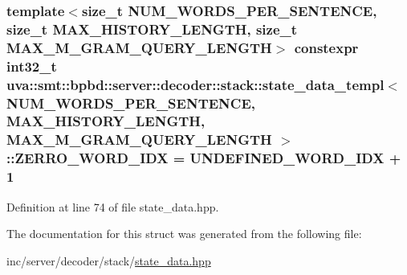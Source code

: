 \subsubsection[{Z\+E\+R\+R\+O\+\_\+\+W\+O\+R\+D\+\_\+\+I\+D\+X}]{\setlength{\rightskip}{0pt plus 5cm}template$<$size\+\_\+t N\+U\+M\+\_\+\+W\+O\+R\+D\+S\+\_\+\+P\+E\+R\+\_\+\+S\+E\+N\+T\+E\+N\+C\+E, size\+\_\+t M\+A\+X\+\_\+\+H\+I\+S\+T\+O\+R\+Y\+\_\+\+L\+E\+N\+G\+T\+H, size\+\_\+t M\+A\+X\+\_\+\+M\+\_\+\+G\+R\+A\+M\+\_\+\+Q\+U\+E\+R\+Y\+\_\+\+L\+E\+N\+G\+T\+H$>$ constexpr int32\+\_\+t {\bf uva\+::smt\+::bpbd\+::server\+::decoder\+::stack\+::state\+\_\+data\+\_\+templ}$<$ N\+U\+M\+\_\+\+W\+O\+R\+D\+S\+\_\+\+P\+E\+R\+\_\+\+S\+E\+N\+T\+E\+N\+C\+E, M\+A\+X\+\_\+\+H\+I\+S\+T\+O\+R\+Y\+\_\+\+L\+E\+N\+G\+T\+H, M\+A\+X\+\_\+\+M\+\_\+\+G\+R\+A\+M\+\_\+\+Q\+U\+E\+R\+Y\+\_\+\+L\+E\+N\+G\+T\+H $>$\+::Z\+E\+R\+R\+O\+\_\+\+W\+O\+R\+D\+\_\+\+I\+D\+X = {\bf U\+N\+D\+E\+F\+I\+N\+E\+D\+\_\+\+W\+O\+R\+D\+\_\+\+I\+D\+X} + 1\hspace{0.3cm}{\ttfamily [static]}}\label{structuva_1_1smt_1_1bpbd_1_1server_1_1decoder_1_1stack_1_1state__data__templ_ac5e9bfa508a553d91bb81e179cb869b1}


Definition at line 74 of file state\+\_\+data.\+hpp.



The documentation for this struct was generated from the following file\+:\begin{DoxyCompactItemize}
\item 
inc/server/decoder/stack/\hyperlink{state__data_8hpp}{state\+\_\+data.\+hpp}\end{DoxyCompactItemize}
